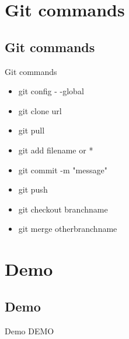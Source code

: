 \section{Git commands}
\subsection{Git commands}
\begin{frame}{Git commands}
    \begin{itemize}
        \item git config - -global
        \item git clone url
        \item git pull
        \item git add filename or *
        \item git commit -m "message"
        \item git push
        \item git checkout branchname
        \item git merge otherbranchname
    \end{itemize}
\end{frame}

\section{Demo}
\subsection{Demo}
\begin{frame}{Demo}
    \centering
    DEMO
    
\end{frame}

